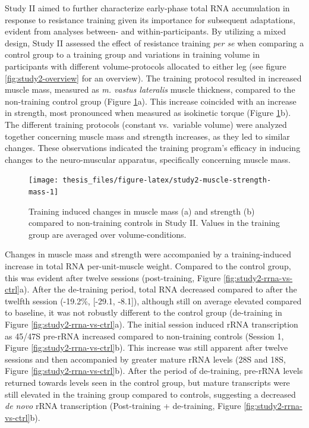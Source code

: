 \documentclass[twoside,10pt]{gihclass} %
\begin{document}
Study II aimed to further characterize early-phase total RNA accumulation in response to resistance training given its importance for subsequent adaptations, evident from analyses between- and within-participants.
By utilizing a mixed design, Study II assessed the effect of resistance training \emph{per se} when comparing a control group to a training group and variations in training volume in participants with different volume-protocols allocated to either leg (see figure \ref{fig:study2-overview} for an overview). The training protocol resulted in increased muscle mass, measured as \emph{m. vastus lateralis} muscle thickness, compared to the non-training control group (Figure \ref{fig:study2-muscle-strength-mass}a). This increase coincided with an increase in strength, most pronounced when measured as isokinetic torque (Figure \ref{fig:study2-muscle-strength-mass}b). The different training protocols (constant vs.~variable volume) were analyzed together concerning muscle mass and strength increases, as they led to similar changes.
These observations indicated the training program's efficacy in inducing changes to the neuro-muscular apparatus, specifically concerning muscle mass.
\begin{figure}

{\centering \texttt{[image: thesis\_files/figure-latex/study2-muscle-strength-mass-1]} 

}

\caption[Muscle mass and strength changes in Study II]{Training induced changes in muscle mass (a) and strength (b) compared to non-training controls in Study II. Values in the training group are averaged over volume-conditions.}\label{fig:study2-muscle-strength-mass}
\end{figure}
Changes in muscle mass and strength were accompanied by a training-induced increase in total RNA per-unit-muscle weight. Compared to the control group, this was evident after twelve sessions (post-training, Figure \ref{fig:study2-rrna-vs-ctrl}a).
After the de-training period, total RNA decreased compared to after the twelfth session (-19.2\%, {[}-29.1, -8.1{]}), although still on average elevated compared to baseline, it was not robustly different to the control group (de-training in Figure \ref{fig:study2-rrna-vs-ctrl}a).
The initial session induced rRNA transcription as 45/47S pre-rRNA increased compared to non-training controls (Session 1, Figure \ref{fig:study2-rrna-vs-ctrl}b). This increase was still apparent after twelve sessions and then accompanied by greater mature rRNA levels (28S and 18S, Figure \ref{fig:study2-rrna-vs-ctrl}b). After the period of de-training, pre-rRNA levels returned towards levels seen in the control group, but mature transcripts were still elevated in the training group compared to controls, suggesting a decreased \emph{de novo} rRNA transcription (Post-training + de-training, Figure \ref{fig:study2-rrna-vs-ctrl}b).
\end{document}
